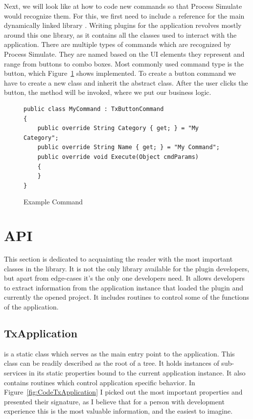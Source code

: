 Next, we will look like at how to code new commands so that Process Simulate would recognize them. 
For this, we first need to include a reference for the main dynamically linked library . 
Writing plugins for the application revolves mostly around this one library, as it contains all the classes used to interact with the application. 
There are multiple types of commands which are recognized by Process Simulate.
They are named based on the UI elements they represent and range from buttons to combo boxes. 
Most commonly used command type is the button, which Figure~\ref{fig:CodeCommand} shows implemented.
To create a button command we have to create a new class and inherit the  abstract class.
After the user clicks the button, the  method will be invoked, where we put our business logic. \\

\begin{figure}[H]
    \caption{Example Command}
    \centering
    \begin{verbatim}
public class MyCommand : TxButtonCommand
{
    public override String Category { get; } = "My Category";
    public override String Name { get; } = "My Command";
    public override void Execute(Object cmdParams)
    {
    }
}
    \end{verbatim}
    \label{fig:CodeCommand}
\end{figure}

\section{API}

This section is dedicated to acquainting the reader with the most important classes in the  library. It is not the only library available for the plugin developers, but apart from edge-cases it's the only one developers need. It allows developers to extract information from the application instance that loaded the plugin and currently the opened project. It includes routines to control some of the functions of the application.

\subsection{TxApplication}
 is a static class which serves as the main entry point to the application. This class can be readily described as the root of a tree. It holds instances of sub-services in its static properties bound to the current application instance. It also contains routines which control application specific behavior. In Figure~\ref{fig:CodeTxApplication} I picked out the most important properties and presented their signature, as I believe that for a person with development experience this is the most valuable information, and the easiest to imagine.

